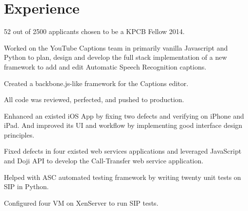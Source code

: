 \documentclass[letterpaper]{lyu-resume} %
\begin{document}
\hfill
%
%
\begin{minipage}[t]{0.66\textwidth} %


\section{Experience}


\vspace{\topsep} %
\begin{tightitemize}
\item 52 out of 2500 applicants chosen to be a KPCB Fellow 2014.
\end{tightitemize}

\sectionspace %



\begin{tightitemize}
\item Worked on the YouTube Captions team in primarily vanilla Javascript and Python to plan, design and develop the full stack implementation of a new framework to add and edit Automatic Speech Recognition captions.
\item Created a backbone.js-like framework for the Captions editor.
\item All code was reviewed, perfected, and pushed to production.
\end{tightitemize}

\sectionspace %



\begin{tightitemize}
\item Enhanced an existed iOS App by fixing two defects and verifying on iPhone and iPad. And improved its UI and workflow by implementing good interface design principles.
\item Fixed defects in four existed web services applications and leveraged JavaScript and Doji API to develop the Call-Transfer web service application. 
\item Helped with ASC automated testing framework by writing twenty unit tests on SIP in Python.
\item Configured four VM on XenServer to run SIP tests.
\end{tightitemize}


\end{minipage}
\end{document}
